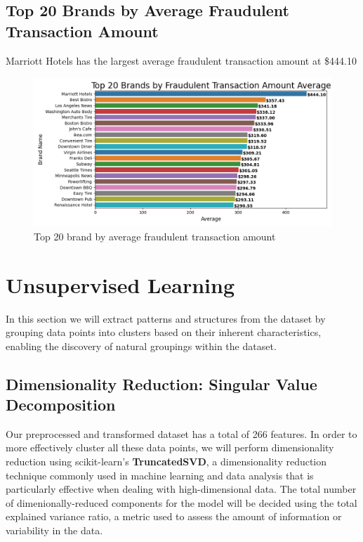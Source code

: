 \documentclass[12pt]{article}
\begin{document}
\newpage
\subsection{Top 20 Brands by Average Fraudulent Transaction Amount}
Marriott Hotels has the largest average fraudulent transaction amount at \$444.10
\begin{figure}[h]
    \centering
    \includegraphics[width=\textwidth]{images/top_20_merchants_by_avg_trans_amount.png}
    \caption{Top 20 brand by average fraudulent transaction amount}
    \label{fig:my_label}
\end{figure}

\newpage
\section{Unsupervised Learning}
In this section we will extract patterns and structures from the dataset by grouping data points into clusters based on their inherent characteristics, enabling the discovery of natural groupings within the dataset.

\subsection{Dimensionality Reduction: Singular Value Decomposition}
Our preprocessed and transformed dataset has a total of 266 features. In order to more effectively cluster all these data points, we will perform dimensionality reduction using scikit-learn's \textbf{TruncatedSVD}, a dimensionality reduction technique commonly used in machine learning and data analysis that is particularly effective when dealing with high-dimensional data. The total number of dimenionally-reduced components for the model will be decided using the total explained variance ratio, a metric used to assess the amount of information or variability in the data.
\end{document}
